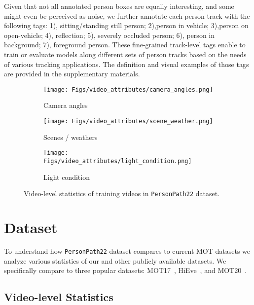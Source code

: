 \documentclass[runningheads]{llncs}
\begin{document}
Given that not all annotated person boxes are equally interesting, and some might even be perceived as noise, we further annotate each person track with the following tags: 1), sitting/standing still person; 2),person in vehicle; 3),person on open-vehicle; 4), reflection; 5), severely occluded person; 6), person in background; 7), foreground person. These fine-grained track-level tags enable to train or evaluate models along different sets of person tracks based on the needs of various tracking applications. The definition and visual examples of those tags are provided in the supplementary materials.


 \begin{figure}[t]
    \centering
    \begin{subfigure}[b]{0.3\textwidth}
    \centering
    \texttt{[image: Figs/video\_attributes/camera\_angles.png]}
    \caption{ Camera angles}
    \label{fig:camera_angles}
    \end{subfigure}
    \begin{subfigure}[b]{0.4\textwidth}
    \centering
    \texttt{[image: Figs/video\_attributes/scene\_weather.png]}
    \caption{ Scenes / weathers}
    \label{fig:scene_weather}
    \end{subfigure}
    \begin{subfigure}[b]{0.25\textwidth}
    \centering
    \texttt{[image: Figs/video\_attributes/light\_condition.png]}
    \caption{ Light condition}
    \label{fig:light_condition}
    \end{subfigure}
    \caption{ \small Video-level statistics of training videos in \texttt{PersonPath22} dataset.}
    \label{fig:video_statistics}
\end{figure}


\section{Dataset}\label{sec:dataset}
To understand how \texttt{PersonPath22} dataset compares to current MOT datasets we analyze various statistics of our and other publicly available datasets. We specifically compare to three popular datasets: MOT17~\cite{mot}, HiEve~\cite{hieve}, and MOT20~\cite{mot20}.

\subsection{Video-level Statistics}
\end{document}
